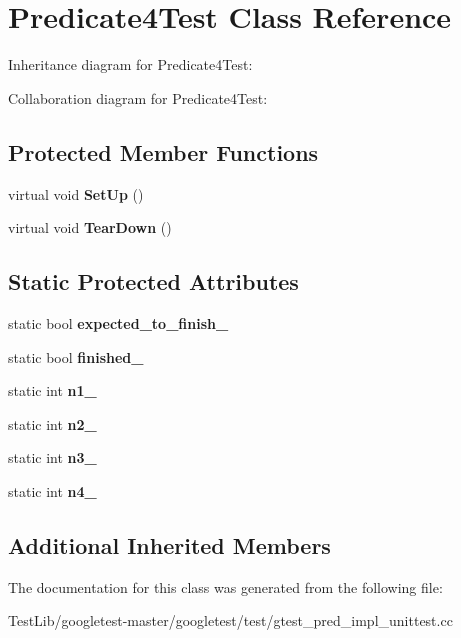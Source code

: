 \hypertarget{classPredicate4Test}{}\section{Predicate4\+Test Class Reference}
\label{classPredicate4Test}


Inheritance diagram for Predicate4\+Test\+:


Collaboration diagram for Predicate4\+Test\+:
\subsection*{Protected Member Functions}
\begin{DoxyCompactItemize}
\item 
\mbox{\label{classPredicate4Test_afcf9db5dc68e97291813cdfeb2aaa5d2}} 
virtual void {\bfseries Set\+Up} ()
\item 
\mbox{\label{classPredicate4Test_ab61983a4cdf3657b02bc2b81b67729c4}} 
virtual void {\bfseries Tear\+Down} ()
\end{DoxyCompactItemize}
\subsection*{Static Protected Attributes}
\begin{DoxyCompactItemize}
\item 
\mbox{\label{classPredicate4Test_a20600b5eda187c42ce4e812e77269654}} 
static bool {\bfseries expected\+\_\+to\+\_\+finish\+\_\+}
\item 
\mbox{\label{classPredicate4Test_acfd174bf9dfb5a91afbcdca17e797888}} 
static bool {\bfseries finished\+\_\+}
\item 
\mbox{\label{classPredicate4Test_a8eb30cd283e613f7a2e501a3969be9ae}} 
static int {\bfseries n1\+\_\+}
\item 
\mbox{\label{classPredicate4Test_a088fce743c747e3851c926cb3a87fda3}} 
static int {\bfseries n2\+\_\+}
\item 
\mbox{\label{classPredicate4Test_a00ae6ae54c7d6639d448c036aedb6114}} 
static int {\bfseries n3\+\_\+}
\item 
\mbox{\label{classPredicate4Test_ae42e23ce11e3f1c6b813496d6180cc67}} 
static int {\bfseries n4\+\_\+}
\end{DoxyCompactItemize}
\subsection*{Additional Inherited Members}


The documentation for this class was generated from the following file\+:\begin{DoxyCompactItemize}
\item 
Test\+Lib/googletest-\/master/googletest/test/gtest\+\_\+pred\+\_\+impl\+\_\+unittest.\+cc\end{DoxyCompactItemize}
